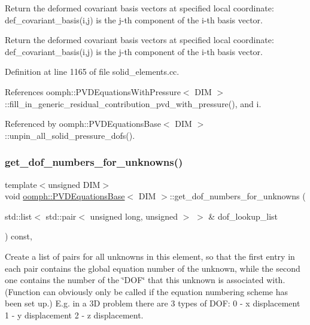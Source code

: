 Return the deformed covariant basis vectors at specified local coordinate\+: {\ttfamily def\+\_\+covariant\+\_\+basis(i,j)} is the j-\/th component of the i-\/th basis vector. 

Return the deformed covariant basis vectors at specified local coordinate\+: {\ttfamily def\+\_\+covariant\+\_\+basis(i,j)} is the j-\/th component of the i-\/th basis vector. 

Definition at line 1165 of file solid\+\_\+elements.\+cc.



References oomph\+::\+P\+V\+D\+Equations\+With\+Pressure$<$ D\+I\+M $>$\+::fill\+\_\+in\+\_\+generic\+\_\+residual\+\_\+contribution\+\_\+pvd\+\_\+with\+\_\+pressure(), and i.



Referenced by oomph\+::\+P\+V\+D\+Equations\+Base$<$ D\+I\+M $>$\+::unpin\+\_\+all\+\_\+solid\+\_\+pressure\+\_\+dofs().

\mbox{\label{classoomph_1_1PVDEquationsBase_af17c01ce27e3a8aa21f86aaed70bc34e}} 
\subsubsection{\texorpdfstring{get\+\_\+dof\+\_\+numbers\+\_\+for\+\_\+unknowns()}{get\_dof\_numbers\_for\_unknowns()}}
{\footnotesize\ttfamily template$<$unsigned D\+IM$>$ \\
void \hyperlink{classoomph_1_1PVDEquationsBase}{oomph\+::\+P\+V\+D\+Equations\+Base}$<$ D\+IM $>$\+::get\+\_\+dof\+\_\+numbers\+\_\+for\+\_\+unknowns (\begin{DoxyParamCaption}\item[{std\+::list$<$ std\+::pair$<$ unsigned long, unsigned $>$ $>$ \&}]{dof\+\_\+lookup\+\_\+list }\end{DoxyParamCaption}) const\hspace{0.3cm}{\ttfamily [inline]}, {\ttfamily [virtual]}}



Create a list of pairs for all unknowns in this element, so that the first entry in each pair contains the global equation number of the unknown, while the second one contains the number of the \char`\"{}\+D\+O\+F\char`\"{} that this unknown is associated with. (Function can obviously only be called if the equation numbering scheme has been set up.) E.\+g. in a 3D problem there are 3 types of D\+OF\+: 0 -\/ x displacement 1 -\/ y displacement 2 -\/ z displacement. 



